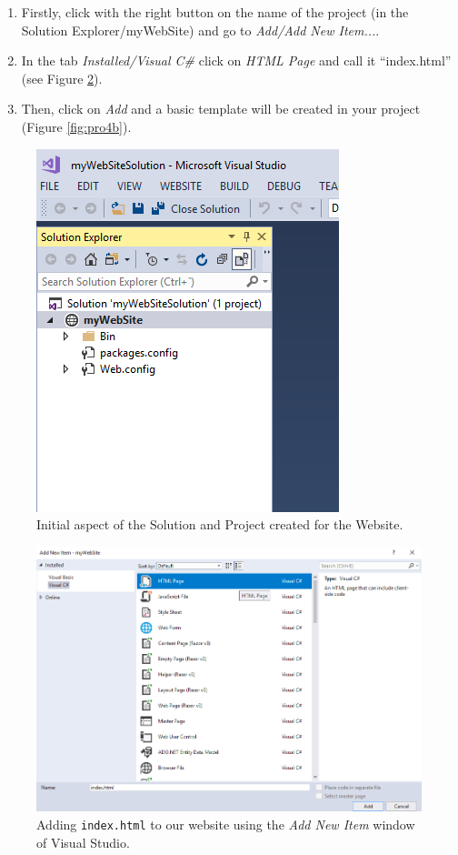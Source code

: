 \begin{enumerate}
    \item Firstly, click with the right button on the name of the project (in the Solution Explorer/myWebSite) and go to \textit{Add/Add New Item...}.
    \item In the tab \textit{Installed/Visual C\#} click on \textit{HTML Page} and call it ``index.html'' (see Figure \ref{fig:pro4a}).
    \item Then, click on \textit{Add} and a basic template will be created in your project (Figure \ref{fig:pro4b}).
\end{enumerate}

\begin{figure}
    \centering
    \includegraphics[width= 0.5 \textwidth]{Figures/Projects/pro3}
    \caption{Initial aspect of the Solution and Project created for the Website.}
    \label{fig:pro3}
\end{figure}

\begin{figure}
    \centering
    \includegraphics[width= \textwidth]{Figures/Projects/pro4a}
    \caption{Adding \texttt{index.html} to our website using the \textit{Add New Item} window of Visual Studio.}
    \label{fig:pro4a}
\end{figure}

